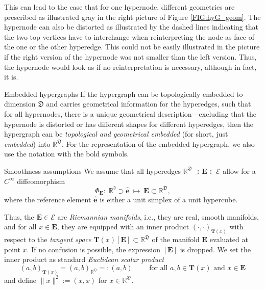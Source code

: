 \documentclass[a4paper, english, 12pt, reqno, draft]{amsart}
\makeatletter
\theoremstyle{definition}
\theoremstyle{remark}
\numberwithin{equation}{section}
\newcommand{\setEdge}{\ensuremath{\mathcal E}}
\newcommand{\SetEdge}{\ensuremath{\boldsymbol{\mathcal E}}}
\newcommand{\Edge}{{\ensuremath{\boldsymbol E}}}
\newcommand{\RefEdge}{{\ensuremath{\widehat{\boldsymbol e}}}}
\newcommand{\locDim}{\ensuremath{\mathfrak d}}
\newcommand{\globDim}{\ensuremath{\mathfrak D}}
\newcommand{\tangent}{\ensuremath{{\boldsymbol T}}}
\newcommand{\diffeo}{\ensuremath{\Phi}}
\newcommand{\IR}{\ensuremath{\mathbb R}}
\def\paragraph{\@startsection{paragraph}{4}%
  \z@\z@{-\fontdimen2\font}%
  {\normalfont\scshape}}
\makeatother
\begin{document}
This can lead to the case that for one hypernode, different geometries are prescribed as illustrated gray in the right picture of Figure \ref{FIG:hyG_geom}. The hypernode can also be distorted as illustrated by the dashed lines indicating that the two top vertices have to interchange when reinterpreting the node as face of the one or the other hyperedge. This could not be easily illustrated in the picture if the right version of the hypernode was not smaller than the left version. Thus, the hypernode would look as if no reinterpretation is necessary, although in fact, it is.

\paragraph{Embedded hypergraphs}
% 
If the hypergraph can be topologically embedded to dimension $\globDim$ and carries geometrical information for the hyperedges, such that for all hypernodes, there is a unique geometrical description---excluding that the hypernode is distorted or has different shapes for different hyperedges, then the hypergraph can be \emph{topological and geometrical embedded} (for short, just \emph{embedded}) into $\IR^\globDim$. For the representation of the embedded hypergraph, we also use the notation with the bold symbols.

\paragraph{Smoothness assumptions}
% 
We assume that all hyperedges $\IR^\globDim \supset \Edge \in \SetEdge$ allow for a $C^\infty$ diffeomorphism
% 
\begin{equation*}
 \diffeo_\Edge \colon \; \IR^\locDim \supset \RefEdge ~\mapsto~ \Edge \subset \IR^\globDim,
\end{equation*}
% 
where the reference element $\RefEdge$ is either a unit simplex of a unit hypercube.

Thus, the $\Edge\in \setEdge$ are \emph{Riemannian manifolds}, i.e., they are real, smooth manifolds, and for all $x \in \Edge$, they are equipped with an inner product $(\cdot,\cdot)_{\tangent(x)}$ with respect to the \emph{tangent space} $\tangent(x)[\Edge] \subset \IR^\globDim$ of the manifold $\Edge$ evaluated at point $x$. If no confusion is possible, the expression $[\Edge]$ is dropped. We set the inner product as standard \emph{Euclidean scalar product}
% 
\begin{equation*}
 (a,b)_{\tangent(x)} = (a,b)_{\IR^\globDim} =: (a,b) \qquad \text{ for all } a,b \in \tangent(x) \text{ and } x \in \Edge
\end{equation*}
% 
and define $\| x \|^2 := (x,x)$ for $x \in \IR^\globDim$.
\end{document}
